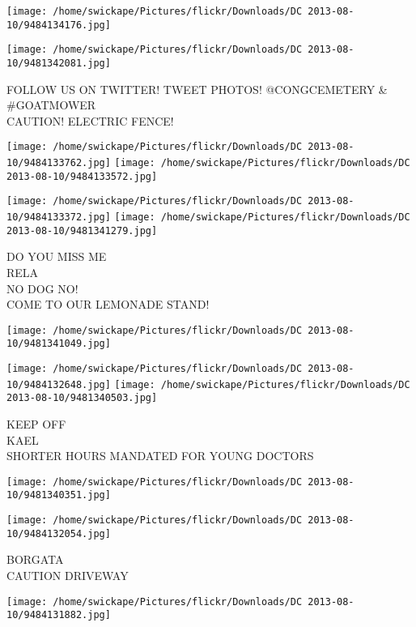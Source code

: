 \documentclass[10pt,letterpaper]{article}
\begin{document}
\texttt{[image: /home/swickape/Pictures/flickr/Downloads/DC 2013-08-10/9484134176.jpg]}

\vspace{0.25in}
\texttt{[image: /home/swickape/Pictures/flickr/Downloads/DC 2013-08-10/9481342081.jpg]}

FOLLOW US ON TWITTER!  TWEET PHOTOS! @CONGCEMETERY \& \#GOATMOWER\\
CAUTION!  ELECTRIC FENCE!\\
\pagebreak

\texttt{[image: /home/swickape/Pictures/flickr/Downloads/DC 2013-08-10/9484133762.jpg]}
\texttt{[image: /home/swickape/Pictures/flickr/Downloads/DC 2013-08-10/9484133572.jpg]}

\texttt{[image: /home/swickape/Pictures/flickr/Downloads/DC 2013-08-10/9484133372.jpg]}
\texttt{[image: /home/swickape/Pictures/flickr/Downloads/DC 2013-08-10/9481341279.jpg]}

DO YOU MISS ME\\
RELA\\
NO DOG NO!\\
COME TO OUR LEMONADE STAND!\\
\pagebreak

\texttt{[image: /home/swickape/Pictures/flickr/Downloads/DC 2013-08-10/9481341049.jpg]}

\vspace{0.25in}
\texttt{[image: /home/swickape/Pictures/flickr/Downloads/DC 2013-08-10/9484132648.jpg]}
\texttt{[image: /home/swickape/Pictures/flickr/Downloads/DC 2013-08-10/9481340503.jpg]}

KEEP OFF\\
KAEL\\
SHORTER HOURS MANDATED FOR YOUNG DOCTORS\\
\pagebreak

\texttt{[image: /home/swickape/Pictures/flickr/Downloads/DC 2013-08-10/9481340351.jpg]}

\vspace{0.25in}
\texttt{[image: /home/swickape/Pictures/flickr/Downloads/DC 2013-08-10/9484132054.jpg]}

BORGATA\\
CAUTION DRIVEWAY\\
\pagebreak

\texttt{[image: /home/swickape/Pictures/flickr/Downloads/DC 2013-08-10/9484131882.jpg]}
\end{document}
